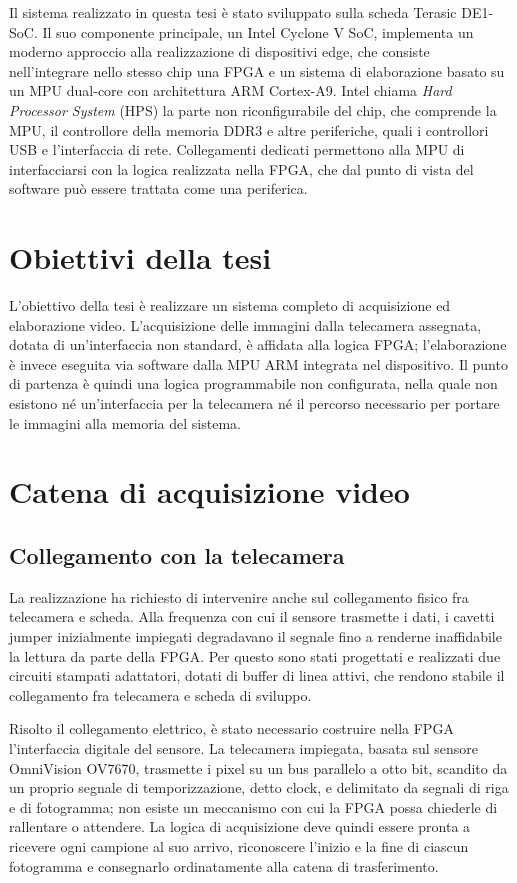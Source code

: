 \documentclass[a4paper,12pt]{article}
\begin{document}
Il sistema realizzato in questa tesi è stato sviluppato sulla scheda Terasic DE1-SoC. Il suo componente principale, un Intel Cyclone V SoC, implementa un moderno approccio alla realizzazione di dispositivi edge, che consiste nell'integrare nello stesso chip una FPGA e un sistema di elaborazione basato su un MPU dual-core con architettura ARM Cortex-A9. Intel chiama \emph{Hard Processor System} (HPS) la parte non riconfigurabile del chip, che comprende la MPU, il controllore della memoria DDR3 e altre periferiche, quali i controllori USB e l'interfaccia di rete. Collegamenti dedicati permettono alla MPU di interfacciarsi con la logica realizzata nella FPGA, che dal punto di vista del software può essere trattata come una periferica.

\section{Obiettivi della tesi}

L'obiettivo della tesi è realizzare un sistema completo di acquisizione ed elaborazione video. L'acquisizione delle immagini dalla telecamera assegnata, dotata di un'interfaccia non standard, è affidata alla logica FPGA; l'elaborazione è invece eseguita via software dalla MPU ARM integrata nel dispositivo. Il punto di partenza è quindi una logica programmabile non configurata, nella quale non esistono né un'interfaccia per la telecamera né il percorso necessario per portare le immagini alla memoria del sistema.

\section{Catena di acquisizione video}

\subsection{Collegamento con la telecamera}

La realizzazione ha richiesto di intervenire anche sul collegamento fisico fra telecamera e scheda. Alla frequenza con cui il sensore trasmette i dati, i cavetti jumper inizialmente impiegati degradavano il segnale fino a renderne inaffidabile la lettura da parte della FPGA. Per questo sono stati progettati e realizzati due circuiti stampati adattatori, dotati di buffer di linea attivi, che rendono stabile il collegamento fra telecamera e scheda di sviluppo.

Risolto il collegamento elettrico, è stato necessario costruire nella FPGA l'interfaccia digitale del sensore. La telecamera impiegata, basata sul sensore OmniVision OV7670, trasmette i pixel su un bus parallelo a otto bit, scandito da un proprio segnale di temporizzazione, detto clock, e delimitato da segnali di riga e di fotogramma; non esiste un meccanismo con cui la FPGA possa chiederle di rallentare o attendere. La logica di acquisizione deve quindi essere pronta a ricevere ogni campione al suo arrivo, riconoscere l'inizio e la fine di ciascun fotogramma e consegnarlo ordinatamente alla catena di trasferimento.
\end{document}
